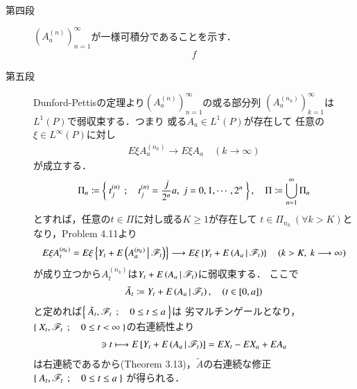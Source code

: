 \begin{prf}[未修正]
\begin{description}
			\item[第四段]
				$\left( A^{(n)}_a \right)_{n=1}^\infty$が一様可積分であることを示す．
				\begin{align}
					f
				\end{align}
				
			\item[第五段]
				Dunford-Pettisの定理より$\left( A^{(n)}_a \right)_{n=1}^\infty$の或る部分列
				$\left( A^{(n_k)}_a \right)_{k=1}^\infty$は$L^1(P)$で弱収束する．つまり
				或る$A_a \in L^1(P)$が存在して
				任意の$\xi \in L^\infty(P)$に対し
				\begin{align}
					E \xi A^{(n_k)}_a \longrightarrow E \xi A_a
					\quad (k \longrightarrow \infty)
				\end{align}
				が成立する．
				\begin{align}
					\Pi_n \coloneqq \left\{\ t^{(n)}_j\ \, ; \quad t^{(n)}_j = \frac{j}{2^n}a,\ j=0,1,\cdots,2^n\ \right\},
					\quad \Pi \coloneqq \bigcup_{n=1}^\infty \Pi_n
				\end{align}
				とすれば，任意の$t \in \Pi$に対し或る$K \geq 1$が存在して
				$t \in \Pi_{n_k}\ (\forall k > K)$となり，Problem 4.11より
				\begin{align}
					E \xi A^{(n_k)}_t
					= E \xi\left\{ Y_t + E\left( A^{(n_k)}_a \, \middle|\, \mathscr{F}_t \right) \right\}
					\longrightarrow E \xi\left\{ Y_t + E\left( A_a \, \middle|\, \mathscr{F}_t \right) \right\}
					\quad (k > K,\ k \longrightarrow \infty)
				\end{align}
				が成り立つから$A^{(n_k)}_t$は$Y_t + E\left( A_a \, \middle|\, \mathscr{F}_t \right)$に弱収束する．
				ここで
				\begin{align}
					\tilde{A}_t \coloneqq Y_t + E\left( A_a \, \middle|\, \mathscr{F}_t \right),
					\quad (t \in [0,a])
				\end{align}
				と定めれば$\left\{\ \tilde{A}_t,\mathscr{F}_t\ \, ; \quad 0 \leq t \leq a\ \right\}$は
				劣マルチンゲールとなり，$\left\{\ X_t,\mathscr{F}_t\ \, ; \quad 0 \leq t <\infty\ \right\}$の右連続性より
				\begin{align}
					[0,a] \ni t \longmapsto E\left[ Y_t + \cexp{A_a}{\mathscr{F}_t} \right]
					= E X_t - E X_a + E A_a
				\end{align}
				は右連続であるから(Theorem 3.13)，$\tilde{A}$の右連続な修正$\left\{\ A_t,\mathscr{F}_t\ \, ; \quad 0 \leq t \leq a\ \right\}$
				が得られる．
			

\end{description}
\end{prf}
